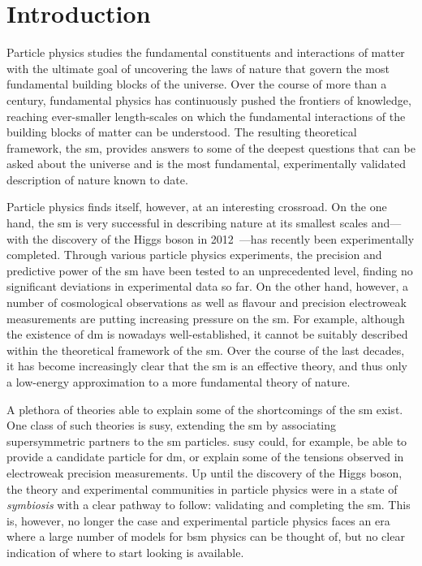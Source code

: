 
\chapter*{Introduction}


Particle physics studies the fundamental constituents and interactions of matter with the ultimate goal of uncovering the laws of nature that govern the most fundamental building blocks of the universe.
Over the course of more than a century, fundamental physics has continuously pushed the frontiers of knowledge, reaching ever-smaller length-scales on which the fundamental interactions of the building blocks of matter can be understood.
The resulting theoretical framework, the \gls{sm}, provides answers to some of the deepest questions that can be asked about the universe and is the most fundamental, experimentally validated description of nature known to date. 

Particle physics finds itself, however, at an interesting crossroad. On the one hand, the \gls{sm} is very successful in describing nature at its smallest scales and---with the discovery of the Higgs boson in 2012~\cite{HIGG-2012-27,CMS-HIG-12-028}---has recently been experimentally completed.
Through various particle physics experiments, the precision and predictive power of the \gls{sm} have been tested to an unprecedented level, finding no significant deviations in experimental data so far.
On the other hand, however, a number of cosmological observations as well as flavour and precision electroweak measurements are putting increasing pressure on the \gls{sm}.
For example, although the existence of \gls{dm} is nowadays well-established, it cannot be suitably described within the theoretical framework of the \gls{sm}.
Over the course of the last decades, it has become increasingly clear that the \gls{sm} is an effective theory, and thus only a low-energy approximation to a more fundamental theory of nature.

A plethora of theories able to explain some of the shortcomings of the \gls{sm} exist. One class of such theories is \gls{susy}, extending the \gls{sm} by associating supersymmetric partners to the \gls{sm} particles.
\gls{susy} could, for example, be able to provide a candidate particle for \gls{dm}, or explain some of the tensions observed in electroweak precision measurements.
Up until the discovery of the Higgs boson, the theory and experimental communities in particle physics were in a state of \textit{symbiosis} with a clear pathway to follow: validating and completing the \gls{sm}. This is, however, no longer the case and experimental particle physics faces an era where a large number of models for \gls{bsm} physics can be thought of, but no clear indication of where to start looking is available. 

